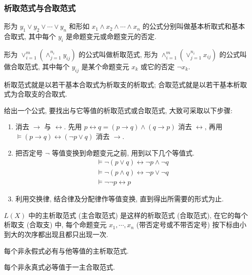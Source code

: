 \documentclass[
    color=black,
    device=normal,
    lang=cn
]{elegantnote}
\begin{document}
\subsubsection{析取范式与合取范式}
\begin{definition}[基本析取式与基本合取式]
    形为 $y_1\lor y_2\lor \cdots\lor y_n$ 和形如 $x_1\land x_2\land \cdots\land x_n$ 的公式分别叫做基本析取式和基本合取式, 其中每个 $y_i$ 是命题变元或命题变元的否定.
\end{definition}
\begin{definition}[析取范式与合取范式]
    形为 $\lor_{i=1}^m\left(\land_{j=1}^{n_i} y_{ij}\right)$ 的公式叫做析取范式, 形为 $\land_{i=1}^m\left(\lor_{j=1}^{n_i} x_{ij}\right)$ 的公式叫做合取范式, 其中每个 $y_{ij}$ 是某个命题变元 $x_k$ 或它的否定 $\lnot x_k$.
\end{definition}
析取范式就是以若干基本合取式为析取支的析取式; 合取范式就是以若干基本析取式为合取支的合取式.

给出一个公式, 要找出与它等值的析取范式或合取范式, 大致可采取以下步骤:
\begin{enumerate}[label = $\arabic*^\circ$, topsep = -1em, listparindent = 2em]
    \item 消去 $\to$ 与 $\leftrightarrow$. 先用 $p\leftrightarrow q = (p\to q)\land (q\to p)$ 消去 $\leftrightarrow$, 再用 $\vDash (p\to q)\leftrightarrow (\lnot p\lor q)$ 消去 $\to$.
    \item 把否定号 $\lnot$ 等值变换到命题变元之前, 用到以下几个等值式.
          \begin{gather*}
              \vDash \lnot (p\lor q) \leftrightarrow \lnot p\land \lnot q\\
              \vDash \lnot (p\land q) \leftrightarrow \lnot p\lor \lnot q\\
              \vDash \lnot\lnot p \leftrightarrow p
          \end{gather*}
    \item 利用交换律, 结合律及分配律作等值变换, 直到得出所需要的形式为止.
\end{enumerate}
\begin{definition}[主析取范式与主合取范式]
    $L(X)$ 中的主析取范式 (主合取范式) 是这样的析取范式 (合取范式), 在它的每个析取支 (合取支) 中, 每个命题变元 $x_1, \cdots,x_n$ (带否定号或不带否定号) 按下标由小到大的次序都出现且都只出现一次.
\end{definition}
\begin{theorem}
    每个非永假式必有与他等值的主析取范式.
\end{theorem}
\begin{theorem}
    每个非永真式必等值于一主合取范式.
\end{theorem}
\end{document}
